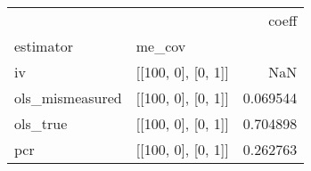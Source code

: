 \begin{tabular}{llr}
\toprule
    &                    &     coeff \\
estimator & me\_cov &           \\
\midrule
iv & [[100, 0], [0, 1]] &       NaN \\
ols\_mismeasured & [[100, 0], [0, 1]] &  0.069544 \\
ols\_true & [[100, 0], [0, 1]] &  0.704898 \\
pcr & [[100, 0], [0, 1]] &  0.262763 \\
\bottomrule
\end{tabular}
